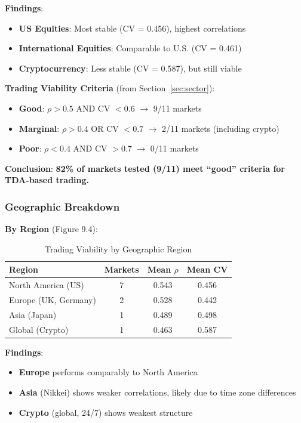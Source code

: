 \textbf{Findings}:
\begin{itemize}
\item \textbf{US Equities}: Most stable (CV = 0.456), highest correlations
\item \textbf{International Equities}: Comparable to U.S. (CV = 0.461)
\item \textbf{Cryptocurrency}: Less stable (CV = 0.587), but still viable
\end{itemize}

\textbf{Trading Viability Criteria} (from Section~\ref{sec:sector}):
\begin{itemize}
\item \textbf{Good}: $\rho > 0.5$ AND CV $< 0.6$ $\rightarrow$ 9/11 markets
\item \textbf{Marginal}: $\rho > 0.4$ OR CV $< 0.7$ $\rightarrow$ 2/11 markets (including crypto)
\item \textbf{Poor}: $\rho < 0.4$ AND CV $> 0.7$ $\rightarrow$ 0/11 markets
\end{itemize}

\textbf{Conclusion}: \textbf{82\% of markets tested (9/11) meet ``good'' criteria for TDA-based trading.}

\subsubsection{Geographic Breakdown}

\textbf{By Region} (Figure 9.4):

\begin{table}[H]
\centering
\caption{Trading Viability by Geographic Region}
\label{tab:geographic-breakdown}
\begin{tabular}{@{}lccc@{}}
\toprule
\textbf{Region} & \textbf{Markets} & \textbf{Mean $\rho$} & \textbf{Mean CV} \\
\midrule
North America (US) & 7 & 0.543 & 0.456 \\
Europe (UK, Germany) & 2 & 0.528 & 0.442 \\
Asia (Japan) & 1 & 0.489 & 0.498 \\
Global (Crypto) & 1 & 0.463 & 0.587 \\
\bottomrule
\end{tabular}
\end{table}

\textbf{Findings}:
\begin{itemize}
\item \textbf{Europe} performs comparably to North America
\item \textbf{Asia} (Nikkei) shows weaker correlations, likely due to time zone differences
\item \textbf{Crypto} (global, 24/7) shows weakest structure
\end{itemize}


